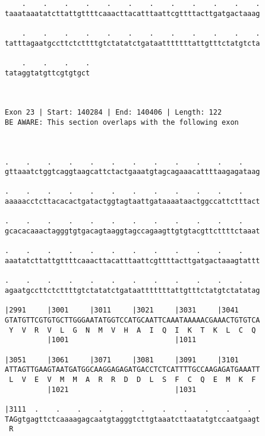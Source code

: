 \documentclass{article}
\begin{document}
\begin{Verbatim}
    .    .    .    .    .    .    .    .    .    .    .    .
taaataaatatcttattgttttcaaacttacatttaattcgttttacttgatgactaaag
                                                            
    .    .    .    .    .    .    .    .    .    .    .    .
tatttagaatgccttctcttttgtctatatctgataatttttttattgtttctatgtcta
                                                            
    .    .    .    .
tataggtatgttcgtgtgct
                    
                    
 
Exon 23 | Start: 140284 | End: 140406 | Length: 122
BE AWARE: This section overlaps with the following exon



.    .    .    .    .    .    .    .    .    .    .    .    
gttaaatctggtcaggtaagcattctactgaaatgtagcagaaacattttaagagataag
                                                            
.    .    .    .    .    .    .    .    .    .    .    .    
aaaaacctcttacacactgatactggtagtaattgataaaataactggccattctttact
                                                            
.    .    .    .    .    .    .    .    .    .    .    .    
gcacacaaactagggtgtgacagtaaggtagccagaagttgtgtacgttcttttctaaat
                                                            
.    .    .    .    .    .    .    .    .    .    .    .    
aaatatcttattgttttcaaacttacatttaattcgttttacttgatgactaaagtattt
                                                            
.    .    .    .    .    .    .    .    .    .    .    .    
agaatgccttctcttttgtctatatctgataatttttttattgtttctatgtctatatag
                                                            
|2991     |3001     |3011     |3021     |3031     |3041     
GTATGTTCGTGTGCTTGGGAATATGGTCCATGCAATTCAAATAAAAACGAAACTGTGTCA
 Y  V  R  V  L  G  N  M  V  H  A  I  Q  I  K  T  K  L  C  Q 
          |1001                         |1011               
  
|3051     |3061     |3071     |3081     |3091     |3101     
ATTAGTTGAAGTAATGATGGCAAGGAGAGATGACCTCTCATTTTGCCAAGAGATGAAATT
 L  V  E  V  M  M  A  R  R  D  D  L  S  F  C  Q  E  M  K  F 
          |1021                         |1031               
  
|3111  .    .    .    .    .    .    .    .    .    .    .  
TAGgtgagttctcaaaagagcaatgtagggtcttgtaaatcttaatatgtccaatgaagt
 R                                                          
                                                            

\end{Verbatim}
\end{document}
